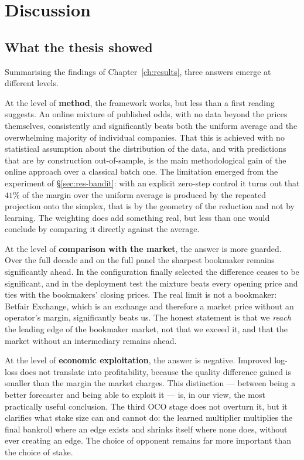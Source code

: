 \documentclass[12pt,a4paper,oneside]{report}
\renewcommand{\_}{\oldunderscore\allowbreak}
\theoremstyle{definition}
\theoremstyle{plain}
\theoremstyle{remark}
\begin{document}
\chapter{Discussion}
\label{ch:discussion}

\section{What the thesis showed}

Summarising the findings of Chapter~\ref{ch:results}, three answers emerge at different levels.

At the level of \textbf{method}, the framework works, but less than a first reading suggests. An
online mixture of published odds, with no data beyond the prices themselves, consistently and
significantly beats both the uniform average and the overwhelming majority of individual
companies. That this is achieved with no statistical assumption about the distribution of the
data, and with predictions that are by construction out-of-sample, is the main methodological
gain of the online approach over a classical batch one. The limitation emerged from the
experiment of \S\ref{sec:res-bandit}: with an explicit zero-step control it turns out that $41\%$
of the margin over the uniform average is produced by the repeated projection onto the simplex,
that is by the geometry of the reduction and not by learning. The weighting does add something
real, but less than one would conclude by comparing it directly against the average.

At the level of \textbf{comparison with the market}, the answer is more guarded. Over the full
decade and on the full panel the sharpest bookmaker remains significantly ahead. In the
configuration finally selected the difference ceases to be significant, and in the deployment
test the mixture beats every opening price and ties with the bookmakers' closing prices. The real
limit is not a bookmaker: Betfair Exchange, which is an exchange and therefore a market price
without an operator's margin, significantly beats us. The honest statement is that we
\emph{reach} the leading edge of the bookmaker market, not that we exceed it, and that the market
without an intermediary remains ahead.

At the level of \textbf{economic exploitation}, the answer is negative. Improved log-loss does
not translate into profitability, because the quality difference gained is smaller than the
margin the market charges. This distinction --- between being a better forecaster and being able
to exploit it --- is, in our view, the most practically useful conclusion. The third OCO stage
does not overturn it, but it clarifies what stake size can and cannot do: the learned multiplier
multiplies the final bankroll where an edge exists and shrinks itself where none does, without
ever creating an edge. The choice of opponent remains far more important than the choice of
stake.
\end{document}
